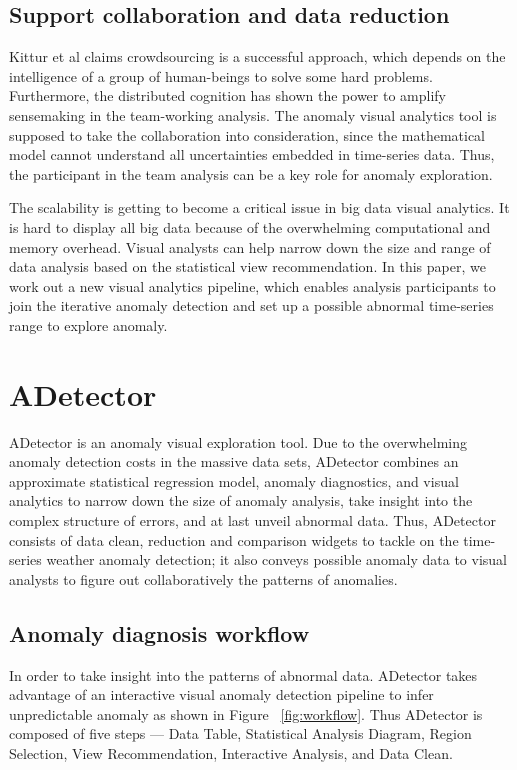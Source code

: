 \documentclass{vgtc}                          %
\begin{document}
\subsection{Support collaboration and data reduction}

Kittur et al\cite{kittur2008crowdsourcing} claims crowdsourcing is a successful approach, which depends on the intelligence of a group of human-beings to solve some hard problems. Furthermore, the distributed cognition\cite{liu2008distributed} has shown the power to amplify sensemaking in the team-working analysis. The anomaly visual analytics tool is supposed to take the collaboration into consideration, since the mathematical model cannot understand all uncertainties embedded in time-series data. Thus, the participant in the team analysis can be a key role for anomaly exploration.
	 
The scalability is getting to become a critical issue in big data visual analytics. It is hard to display all big data because of the overwhelming computational and memory overhead. Visual analysts can help narrow down the size and range of data analysis based on the statistical view recommendation. In this paper, we work out a new visual analytics pipeline, which enables analysis participants to join the iterative anomaly detection and set up a possible abnormal time-series range to explore anomaly.


\section{ADetector}

ADetector is an anomaly visual exploration tool. Due to the overwhelming anomaly detection costs in the massive data sets, ADetector combines an approximate statistical regression model, anomaly diagnostics, and visual analytics to narrow down the size of anomaly analysis, take insight into the complex structure of errors, and at last unveil abnormal data. Thus, ADetector consists of data clean, reduction and comparison widgets to tackle on the time-series weather anomaly detection; it also conveys possible anomaly data to visual analysts to figure out  collaboratively the patterns of anomalies.

\subsection{Anomaly diagnosis workflow}

In order to take insight into the patterns of abnormal data. ADetector takes advantage of an interactive visual anomaly detection pipeline to infer unpredictable anomaly as shown in Figure ~\ref{fig:workflow}. Thus ADetector is composed of five steps --- Data Table, Statistical Analysis Diagram, Region Selection, View Recommendation, Interactive Analysis, and Data Clean.
\end{document}
